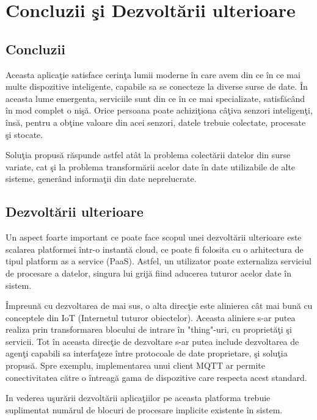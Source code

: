 \chapter{Concluzii şi Dezvoltării ulterioare}
\label{chapter:concluzii}
\section{Concluzii}

Aceasta aplicaţie satisface cerinţa lumii moderne în care avem din ce în ce mai multe dispozitive inteligente, capabile sa se conecteze la diverse surse de date. În aceasta lume emergenta, serviciile sunt din ce în ce mai specializate, satisfăcând în mod complet o nişă. Orice persoana poate achiziţiona câţiva senzori inteligenţi, însă, pentru a obţine valoare din acei senzori, datele trebuie colectate, procesate şi stocate. 

Soluţia propusă răspunde astfel atât la problema colectării datelor din surse variate, cat şi la problema transformării acelor date în date utilizabile de alte sisteme, generând informaţii din date neprelucrate.

\section{Dezvoltării ulterioare}

Un aspect foarte important ce poate face scopul unei dezvoltării ulterioare este scalarea platformei într-o instantă cloud, ce poate fi folosita cu o arhitectura de tipul platform as a service (PaaS). Astfel, un utilizator poate externaliza serviciul de procesare a datelor, singura lui grijă fiind aducerea tuturor acelor date în sistem.

Împreună cu dezvoltarea de mai sus, o alta direcţie este alinierea cât mai bună cu conceptele din IoT (Internetul tuturor obiectelor). Aceasta aliniere s-ar putea realiza prin transformarea blocului de intrare în "thing"-uri, cu proprietăţi şi servicii. Tot în aceasta direcţie de dezvoltare s-ar putea include dezvoltarea de agenţi capabili sa interfaţeze între protocoale de date proprietare, şi soluţia propusă. Spre exemplu, implementarea unui client MQTT ar permite conectivitatea către o întreagă gama de dispozitive care respecta acest standard.

In vederea uşurării dezvoltării aplicaţiilor pe aceasta platforma trebuie suplimentat numărul de blocuri de procesare implicite existente în sistem.